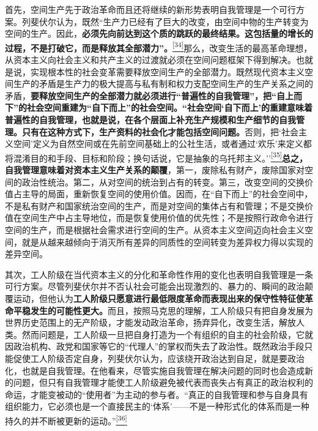\documentclass[UTF8, fontset = sourcesans, a4paper, oneside, zihao =
-4, scheme=chinese, no-math, space=true]{ctexbook}
\begin{document}
首先，空间生产先于政治革命而且还将继续的新形势表明自我管理是一个可行方案。列斐伏尔认为，既然``生产力已经有了巨大的改变，由空间中物的生产转变为空间的生产。因此，\textbf{必须先向前达到这个质的跳跃的最终结果。这包括量的增长的过程，不是打破它，而是释放其全部潜力''。}\protect\hypertarget{part0008_split_002.htmlux5cux23w34}{}{}\protect\hyperlink{part0008_split_003.htmlux5cux23m34}{\textsuperscript{{[}34{]}}}那么，改变生活的最高革命理想，从资本主义向社会主义和共产主义的过渡就必须在空间问题框架下得到解决。也就是说，实现根本性的社会变革需要释放空间生产的全部潜力。既然现代资本主义空间生产的矛盾是生产力的极大提高与私有制和权力支配空间生产的生产关系之间的矛盾，\textbf{要释放空间生产的全部潜力就必须进行``普遍性的自我管理''，把``自上而下''的社会空间重建为``自下而上''的社会空间。``社会空间`自下而上'的重建意味着普遍性的自我管理，也就是说，在各个层面上补充生产规模和生产细节的自我管理。只有在这种方式下，生产资料的社会化才能包括空间问题。}否则，把`社会主义空间'定义为自然空间或在先前空间基础上的公社生活，或者通过`欢乐'来定义都将混淆目的和手段、目标和阶段；换句话说，它是抽象的乌托邦主义。''\protect\hypertarget{part0008_split_002.htmlux5cux23w35}{}{}\protect\hyperlink{part0008_split_003.htmlux5cux23m35}{\textsuperscript{{[}35{]}}}\textbf{总之，自我管理意味着对资本主义生产关系的颠覆}，第一，废除私有财产，废除国家对空间的政治性统治。第二，从对空间的统治到占有的转变。第三，改变空间的交换价值占主导的局面，重新恢复空间的使用价值。因而，在``自下而上''的社会空间中，不是私有财产和国家统治空间的生产，而是对空间的集体占有和管理；不是交换价值在空间生产中占主导地位，而是恢复使用价值的优先性；不是按照行政命令进行空间的生产，而是根据社会需求进行空间的生产。从资本主义空间迈向社会主义空间，就是从越来越倾向于消灭所有差异的同质性的空间转变为差异权力得以实现的差异空间。

其次，工人阶级在当代资本主义的分化和革命性作用的变化也表明自我管理是一条可行方案。尽管列斐伏尔并不否认社会可能会出现激烈的、暴力的、瞬间的政治颠覆运动，但他认为\textbf{工人阶级只愿意进行最低限度革命而表现出来的保守性特征使革命平稳发生的可能性更大。}而且，按照马克思的理解，工人阶级只有把自身发展为世界历史范围上的无产阶级，才能发动政治革命，扬弃异化，改变生活，解放人类。然而问题是，工人阶级一旦把自身打造为一个有组织的自主的社会阶级，它就因政治机构、政党和国家等它的``代理人''的掌权而失去了政治性。既然政治手段只能促使工人阶级否定自身，列斐伏尔认为，应该绕开政治达到自足，就是要政治化，也就是自我管理。在他看来，尽管实施自我管理在解决问题的同时也会造成新的问题，但只有自我管理才能使工人阶级避免被代表而丧失占有真正的政治权利的命运，才能变被动的``使用者''为主动的参与者。``真正的自我管理和参与自身具有组织能力，它必须也是一个直接民主的`体系'------不是一种形式化的体系而是一种持久的并不断被更新的运动。''\protect\hypertarget{part0008_split_002.htmlux5cux23w36}{}{}\protect\hyperlink{part0008_split_003.htmlux5cux23m36}{\textsuperscript{{[}36{]}}}
\end{document}
